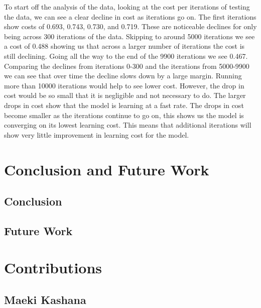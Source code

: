 \documentclass{IEEE}
\begin{document}
To start off the analysis of the data, looking at the cost per iterations of testing the data, we can see a clear decline in cost as iterations go on. The first iterations show costs of 0.693, 0.743, 0.730, and 0.719. These are noticeable declines for only being across 300 iterations of the data. Skipping to around 5000 iterations we see a cost of 0.488 showing us that across a larger number of iterations the cost is still declining. Going all the way to the end of the 9900 iterations we see 0.467. Comparing the declines from iterations 0-300 and the iterations from 5000-9900 we can see that over time the decline slows down by a large margin. Running more than 10000 iterations would help to see lower cost. However, the drop in cost would be so small that it is negligible and not necessary to do. The larger drops in cost show that the model is learning at a fast rate. The drops in cost become smaller as the iterations continue to go on, this shows us the model is converging on its lowest learning cost. This means that additional iterations will show very little improvement in learning cost for the model.

\section{Conclusion and Future Work}

\subsection{Conclusion}

\subsection{Future Work}





\section{Contributions}

\subsection{Maeki Kashana}
\end{document}
